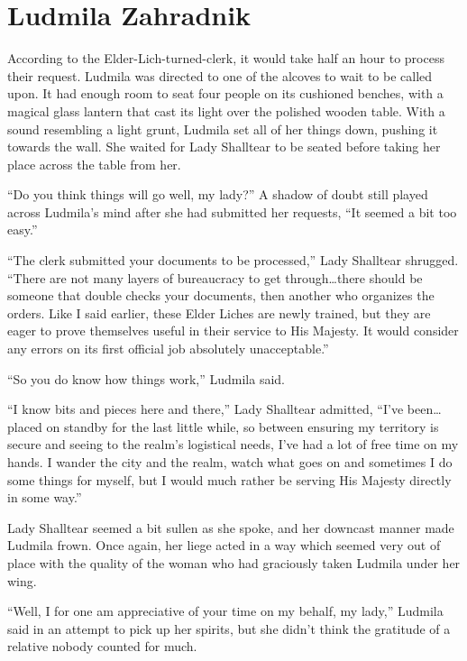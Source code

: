 \chapter{Ludmila Zahradnik}

According to the Elder-Lich-turned-clerk, it would take half an hour to process their request. Ludmila was directed to one of the alcoves to wait to be called upon. It had enough room to seat four people on its cushioned benches, with a magical glass lantern that cast its light over the polished wooden table. With a sound resembling a light grunt, Ludmila set all of her things down, pushing it towards the wall. She waited for Lady Shalltear to be seated before taking her place across the table from her.

 

“Do you think things will go well, my lady?” A shadow of doubt still played across Ludmila’s mind after she had submitted her requests, “It seemed a bit too easy.”

 

“The clerk submitted your documents to be processed,” Lady Shalltear shrugged. “There are not many layers of bureaucracy to get through…there should be someone that double checks your documents, then another who organizes the orders. Like I said earlier, these Elder Liches are newly trained, but they are eager to prove themselves useful in their service to His Majesty. It would consider any errors on its first official job absolutely unacceptable.”

 

“So you do know how things work,” Ludmila said.

 

“I know bits and pieces here and there,” Lady Shalltear admitted, “I’ve been…placed on standby for the last little while, so between ensuring my territory is secure and seeing to the realm's logistical needs, I've had a lot of free time on my hands. I wander the city and the realm, watch what goes on and sometimes I do some things for myself, but I would much rather be serving His Majesty directly in some way.”

 

Lady Shalltear seemed a bit sullen as she spoke, and her downcast manner made Ludmila frown. Once again, her liege acted in a way which seemed very out of place with the quality of the woman who had graciously taken Ludmila under her wing.

 

“Well, I for one am appreciative of your time on my behalf, my lady,” Ludmila said in an attempt to pick up her spirits, but she didn't think the gratitude of a relative nobody counted for much.

